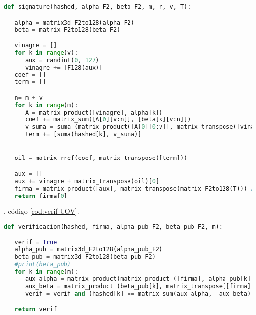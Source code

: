 \begin{lstlisting}[language=Python,caption=Firma del mensaje, label=cod:firma-UOV]
def signature(hashed, alpha_F2, beta_F2, m, r, v, T):

   alpha = matrix3d_F2to128(alpha_F2)
   beta = matrix_F2to128(beta_F2)

   vinagre = []
   for k in range(v):
      aux = randint(0, 127)
      vinagre += [F128(aux)]
   coef = []
   term = []

   n= m + v
   for k in range(m):
      A = matrix_product([vinagre], alpha[k])
      coef += matrix_sum([A[0][v:n]], [beta[k][v:n]])
      v_suma = suma (matrix_product([A[0][0:v]], matrix_transpose([vinagre]))[0][0], matrix_product([beta[k][0:v]], matrix_transpose([vinagre]))[0][0])
      term += [suma(hashed[k], v_suma)]


   oil = matrix_rref(coef, matrix_transpose([term]))

   aux = []
   aux += vinagre + matrix_transpose(oil)[0]
   firma = matrix_product([aux], matrix_transpose(matrix_F2to128(T))) #T = T.inverse()
   return firma[0]
\end{lstlisting}

, código \ref{cod:verif-UOV}.\\

\begin{lstlisting}[language=Python,caption=Verificación de la firma, label=cod:verif-UOV]
def verificacion(hashed, firma, alpha_pub_F2, beta_pub_F2, m):

   verif = True
   alpha_pub = matrix3d_F2to128(alpha_pub_F2)
   beta_pub = matrix3d_F2to128(beta_pub_F2)
   #print(beta_pub)
   for k in range(m):
      aux_alpha = matrix_product(matrix_product ([firma], alpha_pub[k]), matrix_transpose([firma]))
      aux_beta = matrix_product (beta_pub[k], matrix_transpose([firma]))
      verif = verif and (hashed[k] == matrix_sum(aux_alpha,  aux_beta)[0][0])

   return verif
\end{lstlisting}


\begin{lstlisting}[language=Python,caption=Generación clave privada, label=cod:priv-UOV]

\end{lstlisting}



